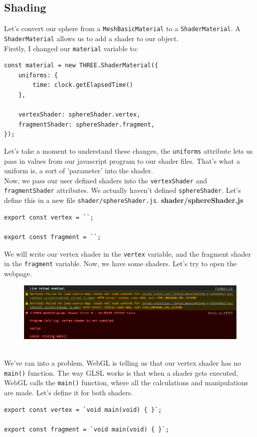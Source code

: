 \subsection{Shading}
Let's convert our sphere from a \verb|MeshBasicMaterial| to a \verb|ShaderMaterial|. A \verb|ShaderMaterial| allows us to add a shader to our object. \\
Firstly, I changed our \verb|material| variable to:
\begin{lstlisting}
const material = new THREE.ShaderMaterial({
	uniforms: {
		time: clock.getElapsedTime()
	},
	
	vertexShader: sphereShader.vertex,
	fragmentShader: sphereShader.fragment,
});
\end{lstlisting}
Let's take a moment to understand these changes, the \verb|uniforms| attribute lets us pass in values from our javascript program to our shader files. That's what a uniform is, a sort of 'parameter' into the shader. \\
Now, we pass our user defined shaders into the \verb|vertexShader| and \verb|fragmentShader| attributes. We actually haven't defined \verb|sphereShader|. Let's define this in a new file \verb|shader/sphereShader.js|.
\newpage
\textbf{shader/sphereShader.js}
\begin{lstlisting}
export const vertex = ``;

export const fragment = ``;
\end{lstlisting}
We will write our vertex shader in the \verb|vertex| variable, and the fragment shader in the \verb|fragment| variable.
Now, we have some shaders. Let's try to open the webpage.
\begin{figure}[h]
\centering
\includegraphics[width=0.7\linewidth]{images/shader_output1}
\caption{}
\label{fig:shaderoutput1}
\end{figure} \\
We've ran into a problem. WebGL is telling us that our vertex shader has no \verb|main()| function. The way GLSL works is that when a shader gets executed, WebGL calls the \verb|main()| function, where all the calculations and manipulations are made. Let's define it for both shaders.
\begin{lstlisting}
export const vertex = `void main(void) { }`;

export const fragment = `void main(void) { }`;
\end{lstlisting}
